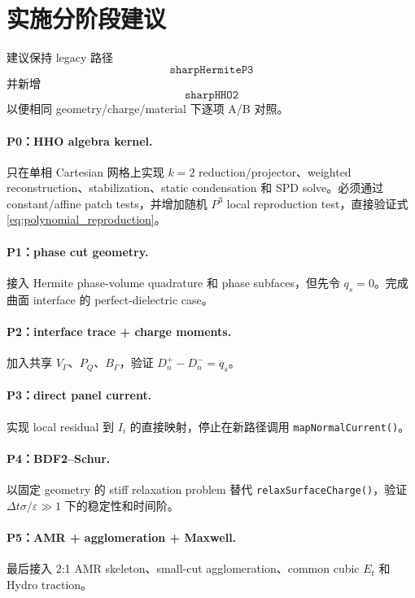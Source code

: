 \documentclass[UTF8,a4paper,11pt]{ctexart}
\newcommand{\eps}{\varepsilon}
\begin{document}
\section{实施分阶段建议}

建议保持 legacy 路径
\[
\texttt{sharpHermiteP3}
\]
并新增
\[
\texttt{sharpHHO2}
\]
以便相同 geometry/charge/material 下逐项 A/B 对照。

\paragraph{P0：HHO algebra kernel.}
只在单相 Cartesian 网格上实现 \(k=2\) reduction/projector、weighted reconstruction、stabilization、static condensation 和 SPD solve。必须通过 constant/affine patch tests，并增加随机 \(P^3\) local reproduction test，直接验证式\eqref{eq:polynomial_reproduction}。

\paragraph{P1：phase cut geometry.}
接入 Hermite phase-volume quadrature 和 phase subfaces，但先令 \(q_s=0\)。完成曲面 interface 的 perfect-dielectric case。

\paragraph{P2：interface trace + charge moments.}
加入共享 \(V_\Gamma\)、\(P_Q\)、\(B_\Gamma\)，验证 \(D_n^+-D_n^-=q_s\)。

\paragraph{P3：direct panel current.}
实现 local residual 到 \(I_i\) 的直接映射，停止在新路径调用 \texttt{mapNormalCurrent()}。

\paragraph{P4：BDF2--Schur.}
以固定 geometry 的 stiff relaxation problem 替代 \texttt{relaxSurfaceCharge()}，验证 \(\Delta t\sigma/\eps\gg1\) 下的稳定性和时间阶。

\paragraph{P5：AMR + agglomeration + Maxwell.}
最后接入 2:1 AMR skeleton、small-cut agglomeration、common cubic \(E_t\) 和 Hydro traction。
\end{document}
